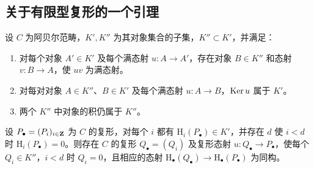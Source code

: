 \subsection{关于有限型复形的一个引理}
设 $C$ 为阿贝尔范畴，$K',K''$ 为其对象集合的子集，$K''\subset K'$，并满足：
\begin{enumerate}[label=(\roman*)]
\item 对每个对象 $A'\in K'$ 及每个满态射 $u:A\to A'$，存在对象 $B\in K''$ 和态射 $v:B\to A$，使 $uv$ 为满态射。
\item 对每对对象 $A\in K''$、$B\in K'$ 及每个满态射 $u:A\to B$，$\operatorname{Ker} u$ 属于 $K'$。
\item 两个 $K''$ 中对象的积仍属于 $K''$。
\end{enumerate}
设 $P_\bullet=(P_i)_{i\in\mathbf Z}$ 为 $C$ 的复形，对每个 $i$ 都有 $\mathrm H_i(P_\bullet)\in K'$，并存在 $d$ 使 $i<d$ 时 $\mathrm H_i(P_\bullet)=0$。则存在 $C$ 的复形 $Q_\bullet=(Q_i)$ 及复形态射 $u:Q_\bullet\to P_\bullet$，使每个 $Q_i\in K''$，$i<d$ 时 $Q_i=0$，且相应的态射 $\mathrm H_\bullet(Q_\bullet)\to\mathrm H_\bullet(P_\bullet)$ 为同构。
